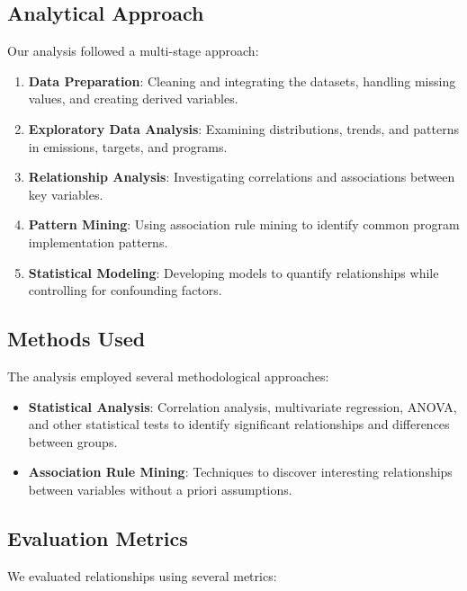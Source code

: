 \documentclass[11pt,a4paper]{article}
\begin{document}
\subsection{Analytical Approach}
Our analysis followed a multi-stage approach:

\begin{enumerate}
    \item \textbf{Data Preparation}: Cleaning and integrating the datasets, handling missing values, and creating derived variables.
    
    \item \textbf{Exploratory Data Analysis}: Examining distributions, trends, and patterns in emissions, targets, and programs.
    
    \item \textbf{Relationship Analysis}: Investigating correlations and associations between key variables.
    
    \item \textbf{Pattern Mining}: Using association rule mining to identify common program implementation patterns.
    
    \item \textbf{Statistical Modeling}: Developing models to quantify relationships while controlling for confounding factors.
\end{enumerate}

\subsection{Methods Used}
The analysis employed several methodological approaches:

\begin{itemize}
    \item \textbf{Statistical Analysis}: Correlation analysis, multivariate regression, ANOVA, and other statistical tests to identify significant relationships and differences between groups.
    
    \item \textbf{Association Rule Mining}: Techniques to discover interesting relationships between variables without a priori assumptions.
\end{itemize}

\subsection{Evaluation Metrics}
We evaluated relationships using several metrics:
\end{document}
